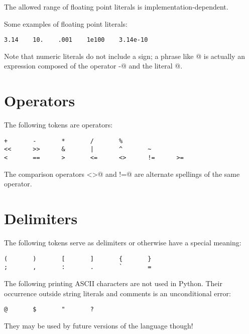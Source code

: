The allowed range of floating point literals is
implementation-dependent.

Some examples of floating point literals:

\begin{verbatim}
3.14    10.    .001    1e100    3.14e-10
\end{verbatim}

Note that numeric literals do not include a sign; a phrase like
@ is actually an expression composed of the operator
\verb@-@ and the literal @.

\section{Operators}

The following tokens are operators:

\begin{verbatim}
+       -       *       /       %
<<      >>      &       |       ^       ~
<       ==      >       <=      <>      !=      >=
\end{verbatim}

The comparison operators \verb@<>@ and \verb@!=@ are alternate
spellings of the same operator.

\section{Delimiters}

The following tokens serve as delimiters or otherwise have a special
meaning:

\begin{verbatim}
(       )       [       ]       {       }
;       ,       :       .       `       =
\end{verbatim}

The following printing ASCII characters are not used in Python.  Their
occurrence outside string literals and comments is an unconditional
error:

\begin{verbatim}
@       $       "       ?
\end{verbatim}

They may be used by future versions of the language though!
